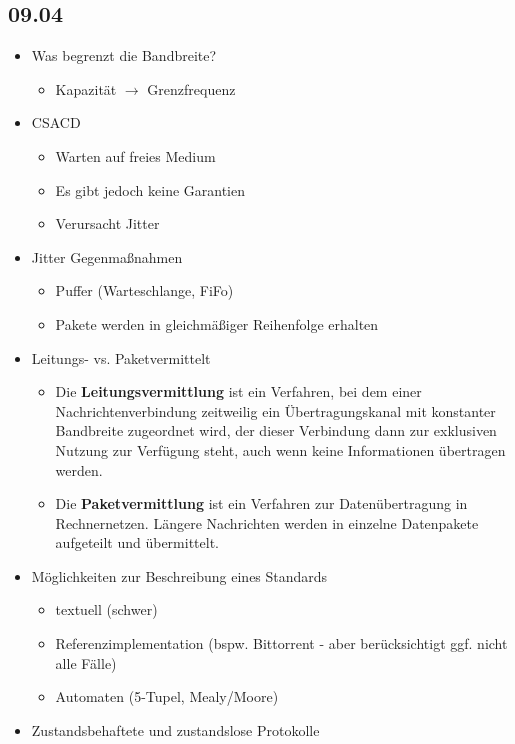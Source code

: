 \documentclass{article} %
\begin{document}
\subsection{09.04}
	\begin{itemize}
		\item Was begrenzt die Bandbreite?
			\begin{itemize}
				\item Kapazität $\rightarrow$ Grenzfrequenz
			\end{itemize}			
		\item CSACD
			\begin{itemize}
				\item Warten auf freies Medium
				\item Es gibt jedoch keine Garantien
				\item Verursacht Jitter
			\end{itemize}
		\item Jitter Gegenmaßnahmen
			\begin{itemize}
				\item Puffer (Warteschlange, FiFo)
				\item Pakete werden in gleichmäßiger Reihenfolge erhalten
			\end{itemize}
		\item Leitungs- vs. Paketvermittelt
			\begin{itemize}
				\item Die \textbf{Leitungsvermittlung} ist ein Verfahren, bei dem einer Nachrichtenverbindung zeitweilig ein Übertragungskanal mit konstanter Bandbreite zugeordnet wird, der dieser Verbindung dann zur exklusiven Nutzung zur Verfügung steht, auch wenn keine Informationen übertragen werden.
				\item Die \textbf{Paketvermittlung} ist ein Verfahren zur Datenübertragung in Rechnernetzen. Längere Nachrichten werden in einzelne Datenpakete aufgeteilt und übermittelt.
			\end{itemize}
		\item Möglichkeiten zur Beschreibung eines Standards
			\begin{itemize}
				\item textuell (schwer)
				\item Referenzimplementation (bspw. Bittorrent - aber berücksichtigt ggf. nicht alle Fälle)
				\item Automaten (5-Tupel, Mealy/Moore)
			\end{itemize}
		\item Zustandsbehaftete und zustandslose Protokolle

\end{itemize}
\end{document}
